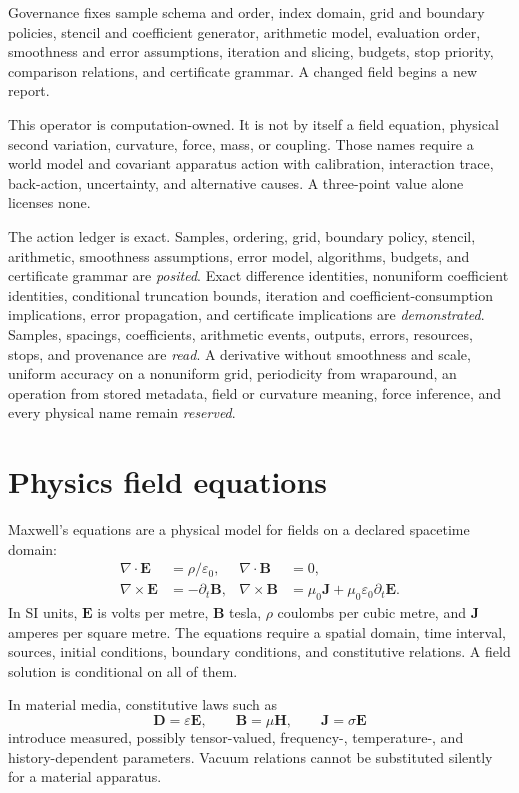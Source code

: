 Governance fixes sample schema and order, index domain, grid and boundary policies, stencil and coefficient generator,
arithmetic model, evaluation order, smoothness and error assumptions, iteration and slicing, budgets, stop priority,
comparison relations, and certificate grammar.  A changed field begins a new report.

This operator is computation-owned.  It is not by itself a field equation, physical second variation, curvature,
force, mass, or coupling.  Those names require a world model and covariant apparatus action with calibration,
interaction trace, back-action, uncertainty, and alternative causes.  A three-point value alone licenses none.

The action ledger is exact.  Samples, ordering, grid, boundary policy, stencil, arithmetic, smoothness assumptions,
error model, algorithms, budgets, and certificate grammar are \emph{posited}.  Exact difference identities,
nonuniform coefficient identities, conditional truncation bounds, iteration and coefficient-consumption implications,
error propagation, and certificate implications are \emph{demonstrated}.  Samples, spacings, coefficients, arithmetic
events, outputs, errors, resources, stops, and provenance are \emph{read}.  A derivative without smoothness and scale,
uniform accuracy on a nonuniform grid, periodicity from wraparound, an operation from stored metadata, field or
curvature meaning, force inference, and every physical name remain \emph{reserved}.
\section{Physics field equations}

Maxwell's equations are a physical model for fields on a declared spacetime domain:
\[
\begin{aligned}
\nabla\cdot\mathbf E&=\rho/\varepsilon_0,&
\nabla\cdot\mathbf B&=0,\\
\nabla\times\mathbf E&=-\partial_t\mathbf B,&
\nabla\times\mathbf B&=\mu_0\mathbf J+\mu_0\varepsilon_0\partial_t\mathbf E.
\end{aligned}
\]
In SI units, \(\mathbf E\) is volts per metre, \(\mathbf B\) tesla, \(\rho\) coulombs per cubic metre, and
\(\mathbf J\) amperes per square metre.  The equations require a spatial domain, time interval, sources, initial
conditions, boundary conditions, and constitutive relations.  A field solution is conditional on all of them.

In material media, constitutive laws such as
\[
                         \mathbf D=\varepsilon\mathbf E,\qquad
                         \mathbf B=\mu\mathbf H,\qquad
                         \mathbf J=\sigma\mathbf E
\]
introduce measured, possibly tensor-valued, frequency-, temperature-, and history-dependent parameters.  Vacuum
relations cannot be substituted silently for a material apparatus.

